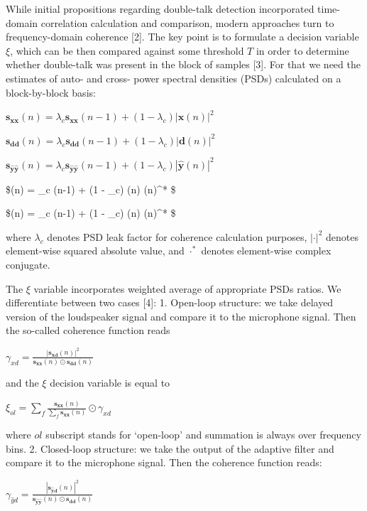 \documentclass[11pt]{article}
\begin{document}
While initial propositions regarding double-talk detection incorporated
time-domain correlation calculation and comparison, modern approaches
turn to frequency-domain coherence {[}2{]}. The key point is to
formulate a decision variable \(\xi\), which can be then compared
against some threshold \(T\) in order to determine whether double-talk
was present in the block of samples {[}3{]}. For that we need the
estimates of auto- and cross- power spectral densities (PSDs) calculated
on a block-by-block basis:

\(\mathbf{s_{xx}}(n) = \lambda_c \mathbf{s_{xx}}(n-1) + (1 - \lambda_c) |\mathbf{x}(n)|^2\)

\(\mathbf{s_{dd}}(n) = \lambda_c \mathbf{s_{dd}}(n-1) + (1 - \lambda_c) |\mathbf{d}(n)|^2\)

\(\mathbf{s_{\hat{y}\hat{y}}}(n) = \lambda_c \mathbf{s_{\hat{y}\hat{y}}}(n-1) + (1 - \lambda_c) |\mathbf{\hat{y}}(n)|^2\)

\$(n) = \lambda\_c (n-1) + (1 -
\lambda\_c) (n) \odot {}(n)\^{}* \$

\$(n) = \lambda\_c (n-1) + (1
- \lambda\_c) (n) \odot {}(n)\^{}* \$

where \(\lambda_c\) denotes PSD leak factor for coherence calculation
purposes, \(| \cdot |^2\) denotes element-wise squared absolute value,
and \(\cdot^*\) denotes element-wise complex conjugate.

The \(\xi\) variable incorporates weighted average of appropriate PSDs
ratios. We differentiate between two cases {[}4{]}: 1. Open-loop
structure: we take delayed version of the loudspeaker signal and compare
it to the microphone signal. Then the so-called coherence function reads

\(\gamma_{xd} = \frac{|\mathbf{s_{xd}}(n)|^2}{\mathbf{s_{xx}}(n) \odot \mathbf{s_{dd}}(n)}\)

and the \(\xi\) decision variable is equal to

\(\xi_{ol} = \sum_{f} \frac{\mathbf{s_{xx}}(n)}{\sum_{f}\mathbf{s_{xx}}(n)} \odot \gamma_{xd}\)

where \(ol\) subscript stands for `open-loop' and summation is always
over frequency bins. 2. Closed-loop structure: we take the output of the
adaptive filter and compare it to the microphone signal. Then the
coherence function reads:

\(\gamma_{\hat{y}d} = \frac{|\mathbf{s_{\hat{y}d}}(n)|^2}{\mathbf{s_{\hat{y}\hat{y}}}(n) \odot \mathbf{s_{dd}}(n)}\)
\end{document}
